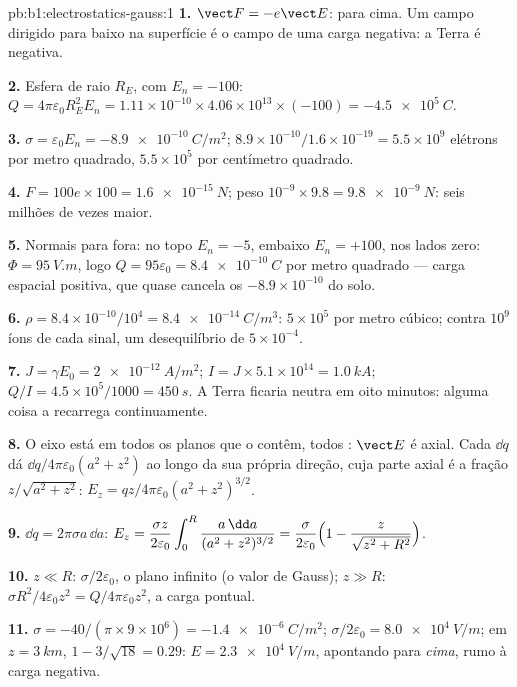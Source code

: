 \begin{solution}{pb:b1:electrostatics-gauss:1}
\textbf{1.} $\vect F = -e\vect E$: para cima. Um campo dirigido para baixo na superfície
é o campo de uma carga negativa: a Terra é negativa.

\textbf{2.} Esfera de raio $R_E$, com $E_n = -100$: $Q = 4\pi\varepsilon_0R_E^2E_n =
1.11 \times 10^{-10} \times 4.06 \times 10^{13} \times (-100) = \qty{-4.5e5}{C}$.

\textbf{3.} $\sigma = \varepsilon_0E_n = \qty{-8.9e-10}{C/m^2}$; $8.9 \times 10^{-10}/1.6 \times
10^{-19} = 5.5 \times 10^9$ elétrons por metro quadrado, $5.5 \times 10^5$ por
centímetro quadrado.

\textbf{4.} $F = 100e \times 100 = \qty{1.6e-15}{N}$; peso $10^{-9} \times 9.8 =
\qty{9.8e-9}{N}$: seis milhões de vezes maior.

\textbf{5.} Normais para fora: no topo $E_n = -5$, embaixo $E_n = +100$, nos lados
zero: $\Phi = \qty{95}{V.m}$, logo $Q = 95\varepsilon_0 = \qty{+8.4e-10}{C}$ por metro
quadrado --- carga espacial positiva, que quase cancela os
$-8.9 \times 10^{-10}$ do solo.

\textbf{6.} $\rho = 8.4 \times 10^{-10}/10^4 = \qty{8.4e-14}{C/m^3}$: $5 \times 10^5$
 por metro cúbico; contra $10^9$ íons de cada sinal,
um desequilíbrio de $5 \times 10^{-4}$.

\textbf{7.} $J = \gamma E_0 = \qty{2e-12}{A/m^2}$; $I = J \times 5.1 \times 10^{14} =
\qty{1.0}{kA}$; $Q/I = 4.5 \times 10^5/1000 = \qty{450}{s}$. A Terra ficaria
neutra em oito minutos: alguma coisa a recarrega continuamente.

\textbf{8.} O eixo está em todos os planos que o contêm, todos : $\vect E$ é axial. Cada $\dd q$ dá $\dd q/4\pi\varepsilon_0(a^2 + z^2)$
ao longo da sua própria direção, cuja parte axial é a fração
$z/\sqrt{a^2 + z^2}$: $E_z = qz/4\pi\varepsilon_0(a^2 + z^2)^{3/2}$.

\textbf{9.} $\dd q = 2\pi\sigma a\,\dd a$: $E_z = \dfrac{\sigma z}{2\varepsilon_0}\displaystyle\int_0^R
\dfrac{a\,\dd a}{(a^2 + z^2)^{3/2}} = \dfrac{\sigma}{2\varepsilon_0}\Bigl(1 - \dfrac{z}{\sqrt{z^2
+ R^2}}\Bigr)$.

\textbf{10.} $z \ll R$: $\sigma/2\varepsilon_0$, o plano infinito (o valor de Gauss);
$z \gg R$: $\sigma R^2/4\varepsilon_0z^2 = Q/4\pi\varepsilon_0z^2$, a carga pontual.

\textbf{11.} $\sigma = -40/(\pi \times 9 \times 10^6) = \qty{-1.4e-6}{C/m^2}$; $\sigma/2\varepsilon_0 =
\qty{8.0e4}{V/m}$; em $z = \qty{3}{km}$, $1 - 3/\sqrt{18} = 0.29$: $E =
\qty{2.3e4}{V/m}$, apontando para \emph{cima}, rumo à carga negativa.


\end{solution}
